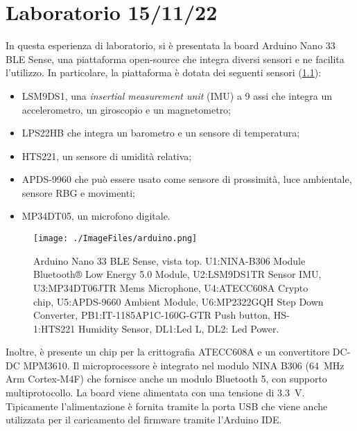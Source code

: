 \chapter{Laboratorio 15/11/22}
In questa esperienza di laboratorio, si è presentata la board Arduino Nano 33 BLE Sense, una piattaforma open-source che integra diversi sensori e ne facilita l'utilizzo. In particolare, la piattaforma è dotata dei seguenti sensori (\Fig\ref{fig:arduino}):
\begin{itemize}
	\item LSM9DS1, una \textit{insertial measurement unit} (IMU) a 9 assi che integra un accelerometro, un giroscopio e un magnetometro;
	\item LPS22HB che integra un barometro e un sensore di temperatura;
	\item HTS221, un sensore di umidità relativa;
	\item APDS-9960 che può essere usato come sensore di prossimità, luce ambientale, sensore RBG e movimenti;
	\item MP34DT05, un microfono digitale.
\end{itemize}
\begin{figure}[b!]
	\centering
	\texttt{[image: ./ImageFiles/arduino.png]}
	\caption{Arduino Nano 33 BLE Sense, vista top. U1:NINA-B306 Module Bluetooth® Low Energy 5.0 Module, U2:LSM9DS1TR Sensor IMU, U3:MP34DT06JTR Mems Microphone, U4:ATECC608A Crypto chip, U5:APDS-9660 Ambient Module, U6:MP2322GQH Step Down Converter, PB1:IT-1185AP1C-160G-GTR Push button, HS-1:HTS221 Humidity Sensor, DL1:Led L, DL2: Led Power.}
	\label{fig:arduino}
\end{figure}
Inoltre, è presente un chip per la crittografia ATECC608A e un convertitore DC-DC MPM3610. Il microprocessore è integrato nel modulo NINA B306 (\SI{64}{\mega\hertz} Arm Cortex-M4F) che fornisce anche un modulo Bluetooth 5, con supporto multiprotocollo. La board viene alimentata con una tensione di \SI{3.3}{\volt}. Tipicamente l'alimentazione è fornita tramite la porta USB che viene anche utilizzata per il caricamento del firmware tramite l'Arduino IDE.


